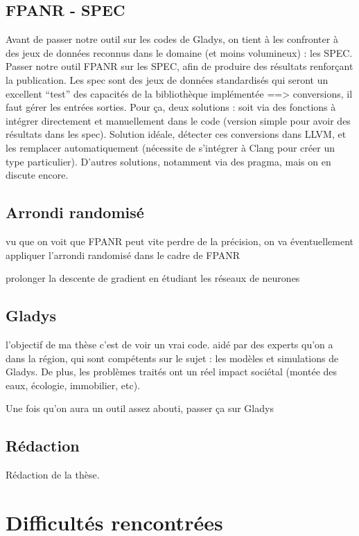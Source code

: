 \documentclass[a4paper,11pt]{article}
\begin{document}
\subsection{FPANR - SPEC}
Avant de passer notre outil sur les codes de Gladys, on tient à les confronter à des jeux de données reconnus dans le domaine (et moins volumineux) : les SPEC.
Passer notre outil FPANR sur les SPEC, afin de produire des résultats renforçant  la publication. Les spec sont des jeux de données standardisés qui seront un excellent “test” des capacités de la bibliothèque implémentée
==> conversions, il faut gérer les entrées sorties. Pour ça, deux solutions : soit via des fonctions à intégrer directement et manuellement dans le code (version simple pour avoir des résultats dans les spec). Solution idéale, détecter ces conversions dans LLVM, et les remplacer automatiquement (nécessite de s’intégrer à Clang pour créer un type particulier). D’autres solutions, notamment via des pragma, mais on en discute encore.

\subsection{Arrondi randomisé}
vu que on voit que FPANR peut vite perdre de la précision, on va éventuellement appliquer l’arrondi randomisé dans le cadre de FPANR

prolonger la descente de gradient en étudiant les réseaux de neurones


\subsection{Gladys}
l’objectif de ma thèse c’est de voir un vrai code. aidé par des experts qu’on a dans la région, qui sont compétents sur le sujet : les modèles et simulations de Gladys.
De plus, les problèmes traités ont un réel impact sociétal (montée des eaux, écologie, immobilier, etc).

Une fois qu’on aura un outil assez abouti, passer ça sur Gladys
\subsection{Rédaction}
Rédaction de la thèse.

\section{Difficultés rencontrées}


\end{document}
